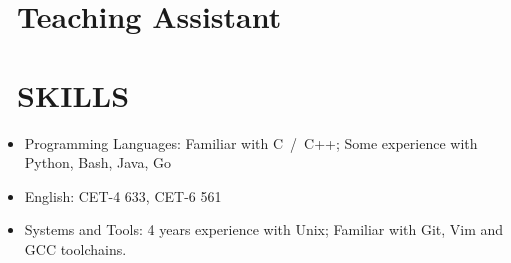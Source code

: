 \documentclass{resume}
\begin{document}
\section{\faBook\ Teaching Assistant}

\section{\faCogs\ SKILLS}
\begin{itemize}[parsep=1.0ex]
  \item Programming Languages: Familiar with C\ /\ C++; Some experience with Python, Bash, Java, Go
  \item English: CET-4 633, CET-6 561
  \item Systems and Tools: 4 years experience with Unix; Familiar with Git, Vim and GCC toolchains.
\end{itemize}
\end{document}
